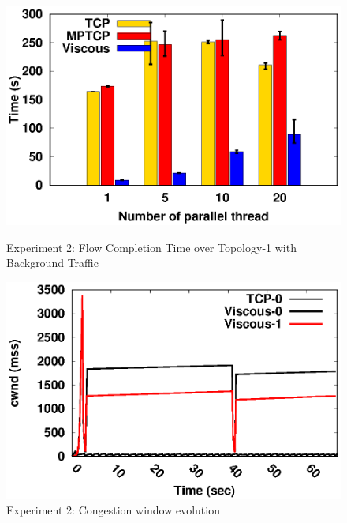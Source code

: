 \begin{figure}[!t]
\begin{center}
\begin{minipage}{0.45\linewidth}
			\label{fig:exp7_time_160}
		\end{minipage}
		\begin{minipage}{0.45\linewidth}
			\centering
			\includegraphics[width=\linewidth]{img/exp7/time_elapsed_20}
			\label{fig:exp7_time_320}
		\end{minipage}
		\caption{\label{fig:exp7_time}Experiment 2: Flow Completion Time over Topology-1 with Background Traffic}
	\end{center}
\end{figure}

\begin{figure}[!t]
	\centering
	\includegraphics[width=0.5\linewidth]{img/exp7/cwnd_sample2_10_20}
	\caption{Experiment 2: Congestion window evolution}
	\label{fig:exp7_cwnd}
\end{figure}


